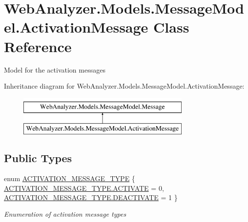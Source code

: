 \hypertarget{class_web_analyzer_1_1_models_1_1_message_model_1_1_activation_message}{}\section{Web\+Analyzer.\+Models.\+Message\+Model.\+Activation\+Message Class Reference}
\label{class_web_analyzer_1_1_models_1_1_message_model_1_1_activation_message}


Model for the activation messages  


Inheritance diagram for Web\+Analyzer.\+Models.\+Message\+Model.\+Activation\+Message\+:\begin{figure}[H]
\begin{center}
\leavevmode
\includegraphics[height=2.000000cm]{class_web_analyzer_1_1_models_1_1_message_model_1_1_activation_message}
\end{center}
\end{figure}
\subsection*{Public Types}
\begin{DoxyCompactItemize}
\item 
enum \hyperlink{class_web_analyzer_1_1_models_1_1_message_model_1_1_activation_message_ad3b5847039dd26527a842c6f7675b1b2}{A\+C\+T\+I\+V\+A\+T\+I\+O\+N\+\_\+\+M\+E\+S\+S\+A\+G\+E\+\_\+\+T\+Y\+P\+E} \{ \hyperlink{class_web_analyzer_1_1_models_1_1_message_model_1_1_activation_message_ad3b5847039dd26527a842c6f7675b1b2aa9409daa2beb494ef861efb51d5cd6bb}{A\+C\+T\+I\+V\+A\+T\+I\+O\+N\+\_\+\+M\+E\+S\+S\+A\+G\+E\+\_\+\+T\+Y\+P\+E.\+A\+C\+T\+I\+V\+A\+T\+E} = 0, 
\hyperlink{class_web_analyzer_1_1_models_1_1_message_model_1_1_activation_message_ad3b5847039dd26527a842c6f7675b1b2a5810e63771fb03117a3e2bcf98d5b9f0}{A\+C\+T\+I\+V\+A\+T\+I\+O\+N\+\_\+\+M\+E\+S\+S\+A\+G\+E\+\_\+\+T\+Y\+P\+E.\+D\+E\+A\+C\+T\+I\+V\+A\+T\+E} = 1
 \}\begin{DoxyCompactList}\small\item\em Enumeration of activation message types \end{DoxyCompactList}
\end{DoxyCompactItemize}
